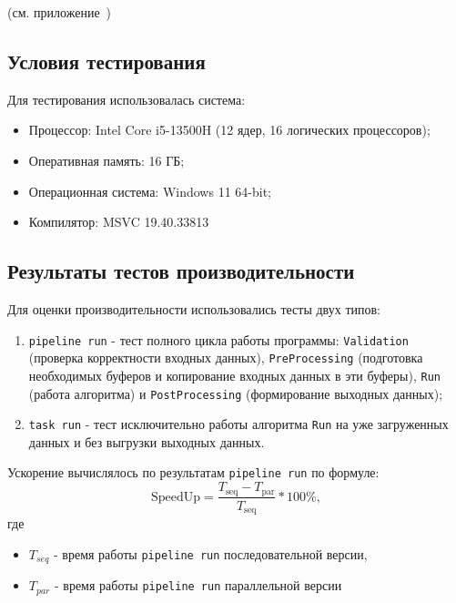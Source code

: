 \documentclass[12pt]{article}
\begin{document}
(см. приложение~)

\subsection{Условия тестирования}
Для тестирования использовалась система:
\begin{itemize}
    \item Процессор: Intel Core i5-13500H (12 ядер, 16 логических процессоров);
    \item Оперативная память: 16 ГБ;
    \item Операционная система: Windows 11 64-bit;  
    \item Компилятор: MSVC 19.40.33813
\end{itemize}

\subsection{Результаты тестов производительности}

Для оценки производительности использовались тесты двух типов:
\begin{enumerate}
    \item \texttt{pipeline run} - тест полного цикла работы программы: \texttt{Validation} (проверка корректности входных данных), \texttt{PreProcessing} (подготовка необходимых буферов и копирование входных данных в эти буферы), \texttt{Run} (работа алгоритма) и \texttt{PostProcessing} (формирование выходных данных);
    \item \texttt{task run} - тест исключительно работы алгоритма \texttt{Run} на уже загруженных данных и без выгрузки выходных данных.
\end{enumerate}

Ускорение вычислялось по результатам \texttt{pipeline run} по формуле:
\[
\text{SpeedUp} = \frac{T_{\text{seq}} - T_{\text{par}}}{T_{\text{seq}}} * 100\%,
\]
где
\begin{itemize}
    \item \(T_{seq}\) - время работы \texttt{pipeline run} последовательной версии,
    \item \(T_{par}\) - время работы \texttt{pipeline run} параллельной версии
\end{itemize}
\end{document}
